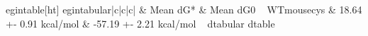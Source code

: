 egin{table}[ht]
egin{tabular}{|c|c|c|}
\hline
  & Mean dG* & Mean dG0 \
\hline
WTmousecys & 18.64 +- 0.91 kcal/mol & -57.19 +- 2.21 kcal/mol \
\hline
d{tabular}
d{table}
